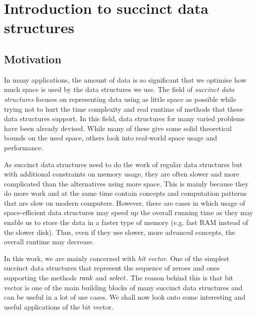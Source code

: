 \chapter{Introduction to succinct data structures}
\label{kap:kap1}

\section{Motivation}

In many applications, the amount of data is so significant that we optimise how much
space is used by the data structures we use. The field of \textit{succinct data structures}
focuses on representing data using as little space as possible while trying not to hurt
the time complexity and real runtime of methods that these data structures support. In
this field, data structures for many varied problems have been already devised. While
many of these give some solid theoretical bounds on the used space, others look into
real-world space usage and performance.

As succinct data structures need to do the work of regular data structures but
with additional constraints on memory usage, they are often slower and more
complicated than the alternatives using more space.  This is mainly because they
do more work and at the same time contain
concepts and computation patterns that are slow on modern computers. However, there
are cases in which usage of space-efficient data structures may speed up the overall
running time as they may enable us to store the data in a faster type of memory
(e.g. fast RAM instead of the slower disk). Thus, even if they use slower, more
advanced concepts, the overall runtime may decrease.


In this work, we are mainly concerned with \textit{bit vector}. One of the simplest
succinct data structures that represent the sequence of zeroes and ones supporting
the methods $\mathit{rank}$ and $\mathit{select}$. The reason behind this is that bit vector is one
of the main building blocks of many succinct data structures and can be useful in a
lot of use cases. We shall now look onto some interesting and useful applications of
the bit vector. 

